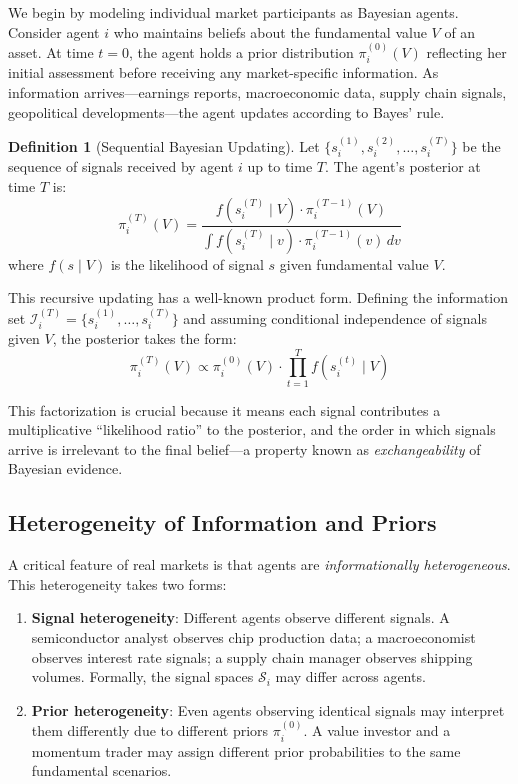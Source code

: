\documentclass[12pt,a4paper]{article}
\theoremstyle{definition}
\newtheorem{definition}[theorem]{Definition}
\newcommand{\I}{\mathcal{I}}
\begin{document}
We begin by modeling individual market participants as Bayesian agents. Consider agent $i$ who maintains beliefs about the fundamental value $V$ of an asset. At time $t=0$, the agent holds a prior distribution $\pi_i^{(0)}(V)$ reflecting her initial assessment before receiving any market-specific information. As information arrives---earnings reports, macroeconomic data, supply chain signals, geopolitical developments---the agent updates according to Bayes' rule.

\begin{definition}[Sequential Bayesian Updating]\label{def:seq_bayes}
Let $\{s_i^{(1)}, s_i^{(2)}, \ldots, s_i^{(T)}\}$ be the sequence of signals received by agent $i$ up to time $T$. The agent's posterior at time $T$ is:
\begin{equation}\label{eq:sequential_update}
    \pi_i^{(T)}(V) = \frac{f(s_i^{(T)} \mid V) \cdot \pi_i^{(T-1)}(V)}{\int f(s_i^{(T)} \mid v) \cdot \pi_i^{(T-1)}(v) \, dv}
\end{equation}
where $f(s \mid V)$ is the likelihood of signal $s$ given fundamental value $V$.
\end{definition}

This recursive updating has a well-known product form. Defining the information set $\I_i^{(T)} = \{s_i^{(1)}, \ldots, s_i^{(T)}\}$ and assuming conditional independence of signals given $V$, the posterior takes the form:
\begin{equation}\label{eq:product_form}
    \pi_i^{(T)}(V) \propto \pi_i^{(0)}(V) \cdot \prod_{t=1}^{T} f(s_i^{(t)} \mid V)
\end{equation}

This factorization is crucial because it means each signal contributes a multiplicative ``likelihood ratio'' to the posterior, and the order in which signals arrive is irrelevant to the final belief---a property known as \emph{exchangeability} of Bayesian evidence.

\subsection{Heterogeneity of Information and Priors}

A critical feature of real markets is that agents are \emph{informationally heterogeneous}. This heterogeneity takes two forms:

\begin{enumerate}[label=(\roman*)]
    \item \textbf{Signal heterogeneity}: Different agents observe different signals. A semiconductor analyst observes chip production data; a macroeconomist observes interest rate signals; a supply chain manager observes shipping volumes. Formally, the signal spaces $\mathcal{S}_i$ may differ across agents.
    
    \item \textbf{Prior heterogeneity}: Even agents observing identical signals may interpret them differently due to different priors $\pi_i^{(0)}$. A value investor and a momentum trader may assign different prior probabilities to the same fundamental scenarios.
\end{enumerate}
\end{document}
